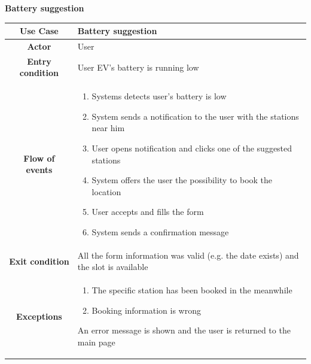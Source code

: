 \documentclass[table, 12pt]{article} %
\begin{document}
\begin{itemize}
            \begin{table}[H]
                \item[] \textbf{Battery suggestion}
                \item[]
                \centering
                \begin{tabular}{|c |m{}|}
                    \hline
                    \textbf{Use Case} & Battery suggestion\\ \hline
                    \textbf{Actor} & User\\ \hline
                    \textbf{Entry condition} & User EV's battery is running low \\  \hline
                    \textbf{Flow of events} & \begin{enumerate}
                                                \item Systems detects user's battery is low
                                                \item System sends a notification to the user with the stations near him
                                                \item User opens notification and clicks one of the suggested stations
                                                \item System offers the user the possibility to book the location
                                                \item User accepts and fills the form
                                                \item System sends a confirmation message
                                            \end{enumerate}\\ \hline
                    \textbf{Exit condition} &  All the form information was valid (e.g. the date exists) and the slot is available\\ \hline
                    \textbf{Exceptions} &  \begin{enumerate}
                        \item The specific station has been booked in the meanwhile
                        \item Booking information is wrong
                    \end{enumerate}
                    An error message is shown and the user is returned to the main page\\ \hline
                \end{tabular}
            \end{table}


\end{itemize}
\end{document}
